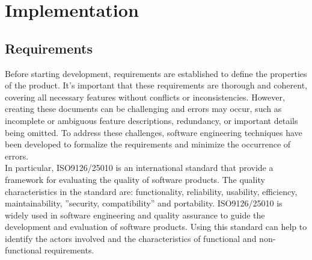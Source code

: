 \chapter{Implementation}
\section{Requirements}
Before starting development, requirements are established to define the properties of the product. It's important that these requirements are thorough and coherent, covering all necessary features without conflicts or inconsistencies. However, creating these documents can be challenging and errors may occur, such as incomplete or ambiguous feature descriptions, redundancy, or important details being omitted. To address these challenges, software engineering techniques have been developed to formalize the requirements and minimize the occurrence of errors.\\
In particular, ISO9126/25010 is an international standard that provide a framework for evaluating the quality of software products. The quality characteristics in the standard are: functionality, reliability, usability, efficiency, maintainability, ''security, compatibility'' and portability.
ISO9126/25010 is widely used in software engineering and quality assurance to guide the development and evaluation of software products. %
Using this standard can help to identify the actors involved and the characteristics of functional and non-functional requirements.

